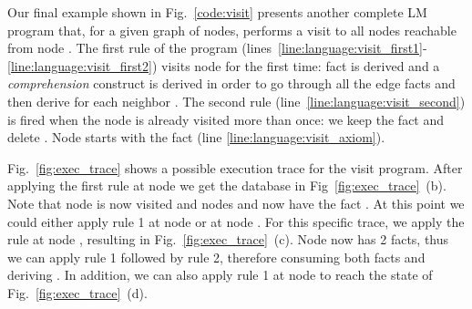 Our final example shown in Fig.~\ref{code:visit} presents another complete LM
program that, for a given graph of nodes, performs a visit to all nodes
reachable from node .  The first rule of the program
(lines~\ref{line:language:visit_first1}-\ref{line:language:visit_first2}) visits
node  for the first time: fact  is derived and a
\emph{comprehension} construct is derived in order to go through all the edge
facts and then derive  for each neighbor .  The
second rule (line~\ref{line:language:visit_second}) is fired when the node is
already visited more than once: we keep the  fact and delete
. Node  starts with the  fact (line
\ref{line:language:visit_axiom}).

Fig.~\ref{fig:exec_trace} shows a possible execution trace for the visit
program.  After applying the first rule at node  we get the database
in Fig~\ref{fig:exec_trace}~(b).  Note that node  is now visited and
nodes  and  now have the fact . At this
point we could either apply rule 1 at node  or at node .
For this specific trace, we apply the rule at node , resulting in
Fig.~\ref{fig:exec_trace}~(c). Node  now has 2 
facts, thus we can apply rule 1 followed by rule 2, therefore consuming both
 facts and deriving . In addition, we can also
apply rule 1 at node  to reach the state of
Fig.~\ref{fig:exec_trace}~(d).

